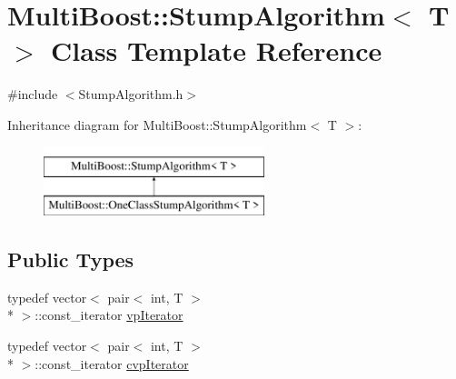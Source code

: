\hypertarget{classMultiBoost_1_1StumpAlgorithm}{\section{Multi\-Boost\-:\-:Stump\-Algorithm$<$ T $>$ Class Template Reference}
\label{classMultiBoost_1_1StumpAlgorithm}
}


{\ttfamily \#include $<$Stump\-Algorithm.\-h$>$}

Inheritance diagram for Multi\-Boost\-:\-:Stump\-Algorithm$<$ T $>$\-:\begin{figure}[H]
\begin{center}
\leavevmode
\includegraphics[height=2.000000cm]{classMultiBoost_1_1StumpAlgorithm}
\end{center}
\end{figure}
\subsection*{Public Types}
\begin{DoxyCompactItemize}
\item 
typedef vector$<$ pair$<$ int, T $>$\\*
 $>$\-::const\-\_\-iterator \hyperlink{classMultiBoost_1_1StumpAlgorithm_a358eae7c8636c09b6b26ef0cc74bbd51}{vp\-Iterator}
\item 
typedef vector$<$ pair$<$ int, T $>$\\*
 $>$\-::const\-\_\-iterator \hyperlink{classMultiBoost_1_1StumpAlgorithm_a0bb544acc46504f3f80a71a58a3ef75a}{cvp\-Iterator}
\end{DoxyCompactItemize}
